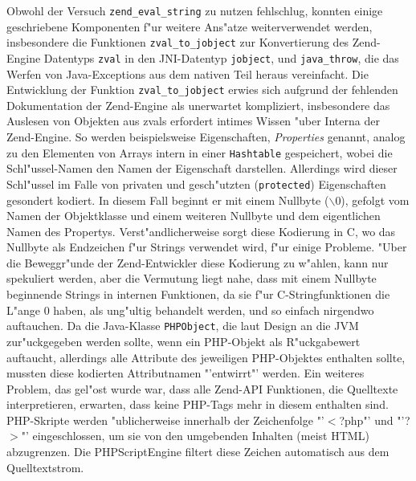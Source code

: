 Obwohl der Versuch \texttt{zend\_eval\_string} zu nutzen fehlschlug, konnten einige geschriebene Komponenten f"ur weitere
Ans"atze weiterverwendet werden, insbesondere die Funktionen \texttt{zval\_to\_jobject} zur Konvertierung des Zend-Engine
Datentyps \texttt{zval} in den JNI-Datentyp \texttt{jobject}, und \texttt{java\_throw}, die das Werfen von Java-Exceptions
aus dem nativen Teil heraus vereinfacht. 
Die Entwicklung der Funktion \texttt{zval\_to\_jobject} erwies sich aufgrund der fehlenden Dokumentation der Zend-Engine als
unerwartet kompliziert, insbesondere das Auslesen von Objekten aus zvals erfordert intimes Wissen "uber Interna der Zend-Engine.
So werden beispielsweise Eigenschaften, \emph{Properties} genannt, analog zu den Elementen von Arrays intern 
in einer \texttt{Hashtable} gespeichert, wobei die Schl"ussel-Namen den Namen der Eigenschaft darstellen. Allerdings wird
dieser Schl"ussel im Falle von privaten und gesch"utzten (\texttt{protected}) Eigenschaften gesondert kodiert. In diesem
Fall beginnt er mit einem Nullbyte ($\backslash$0), gefolgt vom Namen der Objektklasse und einem weiteren Nullbyte und dem eigentlichen
Namen des Propertys. Verst"andlicherweise sorgt diese Kodierung in C, wo das Nullbyte als Endzeichen f"ur Strings verwendet wird,
f"ur einige Probleme. "Uber die Beweggr"unde der Zend-Entwickler diese Kodierung zu w"ahlen, kann nur spekuliert werden, aber 
die Vermutung liegt nahe, dass mit einem Nullbyte beginnende Strings in internen Funktionen, da sie f"ur C-Stringfunktionen die L"ange 0 haben,
als ung"ultig behandelt werden, und so einfach nirgendwo auftauchen. Da die Java-Klasse \texttt{PHPObject}, die laut Design an die JVM
zur"uckgegeben werden sollte, wenn ein PHP-Objekt als R"uckgabewert auftaucht, allerdings alle
Attribute des jeweiligen PHP-Objektes enthalten sollte, mussten diese kodierten Attributnamen "'entwirrt"' werden.
Ein weiteres Problem, das gel"ost wurde war, dass alle Zend-API Funktionen, die
Quelltexte interpretieren, erwarten, dass keine PHP-Tags mehr in diesem enthalten sind. PHP-Skripte werden "ublicherweise
innerhalb der Zeichenfolge "'$<$?php"' und "'?$>$"' eingeschlossen, um sie von den umgebenden Inhalten (meist HTML) abzugrenzen.
Die PHPScriptEngine filtert diese Zeichen automatisch aus dem Quelltextstrom.

